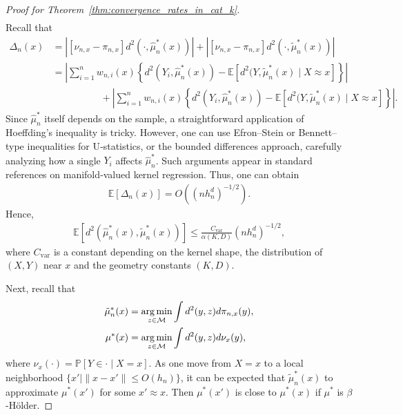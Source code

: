 \begin{proof}[Proof for Theorem~\ref{thm:convergence_rates_in_cat_k}]
\begin{align*}
    \end{align*}
    Recall that
    \begin{align*}
        \Delta_n(x) &= \left|\left[\nu_{n,x} - \pi_{n,x} \right]d^2(\cdot, \hat{\mu}^*_n(x))\right| + \left|\left[\nu_{n,x} - \pi_{n,x} \right]d^2(\cdot, \tilde{\mu}^*_n(x))\right| \\
        &= \left|\sum^n_{i=1} w_{n,i}(x)\left\{d^2(Y_i, \hat{\mu}^*_n(x)) - \mathbb{E}[d^2(Y, \tilde{\mu}^*_n(x) \mid X \approx x]\right\} \right| \\
        &\quad\quad\quad\quad\quad + \left|\sum^n_{i=1} w_{n,i}(x)\left\{d^2(Y_i, \hat{\mu}^*_n(x)) - \mathbb{E}[d^2(Y, \tilde{\mu}^*_n(x) \mid X \approx x]\right\} \right|.
    \end{align*}
    Since $\hat{\mu}^*_n$ itself depends on the sample, a straightforward application of Hoeffding’s inequality is tricky. 
    However, one can use Efron–Stein or Bennett–type inequalities for U‐statistics, or the bounded differences approach, carefully analyzing how a single $Y_i$ affects $\hat{\mu}^*_n$.
    Such arguments appear in standard references on manifold‐valued kernel regression.
    Thus, one can obtain
    \begin{align*}
        \mathbb{E}[\Delta_{n}(x)] = O\left((n h^d_n)^{-1/2}\right).
    \end{align*}
    Hence,
    \begin{align*}
        \mathbb{E}[d^2(\hat{\mu}^*_n(x), \tilde{\mu}^*_n(x))] \leq \frac{C_{\mathrm{var}}}{\alpha(K, D)}(n h^d_n)^{-1/2},
    \end{align*}
    where $C_{\mathrm{var}}$  is a constant depending on the kernel shape, the distribution of $(X, Y)$ near $x$ and the geometry constants $(K, D)$.

    Next, recall that
    \begin{align*}
        \tilde{\mu}^*_n(x) &= \operatorname*{arg\,min}_{z \in \mathcal{M}}\int d^2(y, z)d\pi_{n,x}(y), \\
        \mu^*(x) &= \operatorname*{arg\,min}_{z \in \mathcal{M}} \int d^2(y, z) d\nu_x(y),
    \end{align*}
    where $\nu_x(\cdot) = \mathbb{P}[Y \in \cdot \mid X = x]$.
    As one move from $X = x$ to a local neighborhood $\{x' \mid \|x - x'\| \leq O(h_n) \}$, it can be expected that $\tilde{\mu}^*_n(x)$ to approximate $\mu^*(x')$ for some $x' \approx x$.
    Then $\mu^*(x')$ is close to $\mu^*(x)$ if $\mu^*$ is $\beta$-Hölder.


\end{proof}
